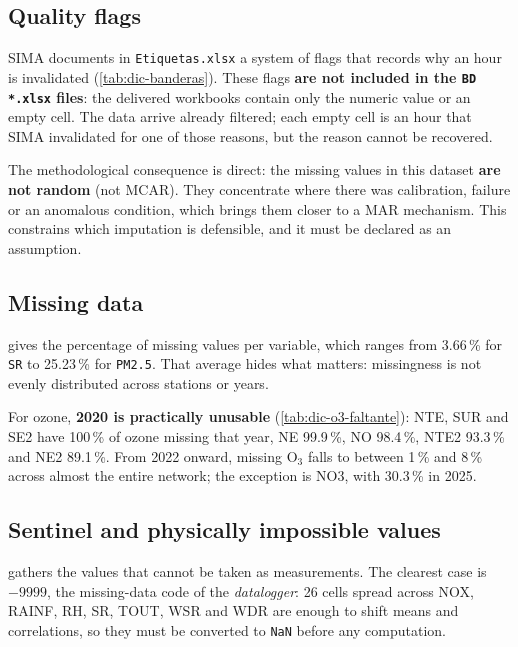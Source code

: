\subsection{Quality flags}\label{sec:dic:banderas}

SIMA documents in \texttt{Etiquetas.xlsx} a system of flags that records why
an hour is invalidated (\cref{tab:dic-banderas}). These flags \textbf{are not
included in the \texttt{BD *.xlsx} files}: the delivered workbooks contain
only the numeric value or an empty cell. The data arrive already filtered;
each empty cell is an hour that SIMA invalidated for one of those reasons, but
the reason cannot be recovered.

The methodological consequence is direct: the missing values in this dataset
\textbf{are not random} (not MCAR). They concentrate where there was
calibration, failure or an anomalous condition, which brings them closer to a
MAR mechanism. This constrains which imputation is defensible, and it must be
declared as an assumption.

\subsection{Missing data}\label{sec:dic:faltantes}

 gives the percentage of missing values per variable,
which ranges from 3.66\,\% for \texttt{SR} to 25.23\,\% for \texttt{PM2.5}.
That average hides what matters: missingness is not evenly distributed across
stations or years.

For ozone, \textbf{2020 is practically unusable}
(\cref{tab:dic-o3-faltante}): NTE, SUR and SE2 have 100\,\% of ozone missing
that year, NE 99.9\,\%, NO 98.4\,\%, NTE2 93.3\,\% and NE2 89.1\,\%. From
2022 onward, missing O$_3$ falls to between 1\,\% and 8\,\% across almost the
entire network; the exception is NO3, with 30.3\,\% in 2025.

\subsection{Sentinel and physically impossible values}\label{sec:dic:centinela}

 gathers the values that cannot be taken as
measurements. The clearest case is $-9999$, the missing-data code of the
\emph{datalogger}: 26 cells spread across NOX, RAINF, RH, SR, TOUT, WSR and
WDR are enough to shift means and correlations, so they must be converted to
\texttt{NaN} before any computation.

